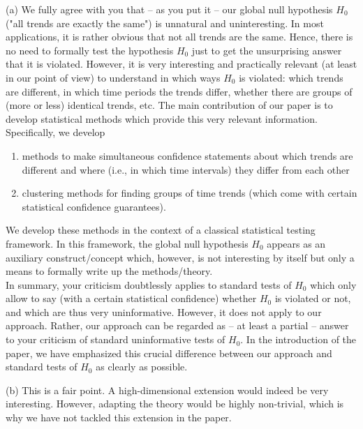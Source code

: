 \documentclass[a4paper,12pt]{article}
\begin{document}
\begin{enumerate}[label=\arabic*.,leftmargin=0.6cm]
(a) We fully agree with you that -- as you put it -- our global null hypothesis $H_0$ ("all trends are exactly the same") is unnatural and uninteresting. In most applications, it is rather obvious that not all trends are the same. Hence, there is no need to formally test the hypothesis $H_0$ just to get the unsurprising answer that it is violated. However, it is very interesting and practically relevant (at least in our point of view) to understand in which ways $H_0$ is violated: which trends are different, in which time periods the trends differ, whether there are groups of (more or less) identical trends, etc. The main contribution of our paper is to develop statistical methods which provide this very relevant information. Specifically, we develop
\begin{enumerate}[label=(\roman*),itemsep=0pt,topsep=0pt,leftmargin=1.5cm]
\item methods to make simultaneous confidence statements about which trends are different and where (i.e., in which time intervals) they differ from each other 
\item clustering methods for finding groups of time trends (which come with certain statistical confidence guarantees). 
\end{enumerate}
We develop these methods in the context of a classical statistical testing framework. In this framework, the global null hypothesis $H_0$ appears as an auxiliary construct/concept which, however, is not interesting by itself but only a means to formally write up the methods/theory. \\
In summary, your criticism doubtlessly applies to standard tests of $H_0$ which only allow to say (with a certain statistical confidence) whether $H_0$ is violated or not, and which are thus very uninformative. However, it does not apply to our approach. Rather, our approach can be regarded as  -- at least a partial -- answer to your criticism of standard uninformative tests of $H_0$. In the introduction of the paper, we have emphasized this crucial difference between our approach and standard tests of $H_0$ as clearly as possible. 

(b) This is a fair point. A high-dimensional extension would indeed be very interesting. However, adapting the theory would be highly non-trivial, which is why we have not tackled this extension in the paper. 


\end{enumerate}
\end{document}
